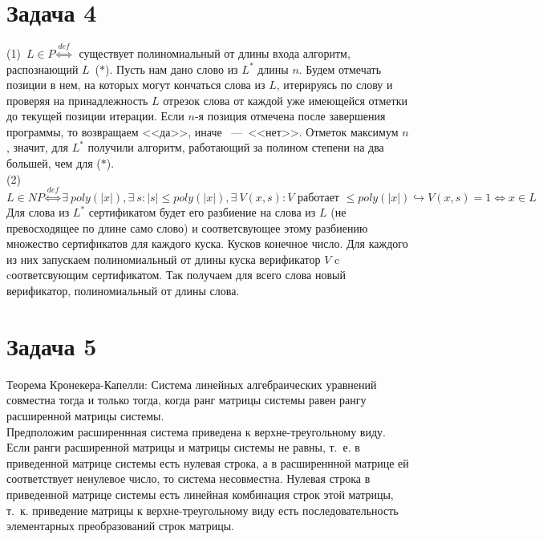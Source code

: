 \documentclass[a4paper,12pt]{article} %
\begin{document}
\section*{Задача 4}
(1)~$L \in P \overset{def}\Leftrightarrow ~$ существует полиномиальный от длины входа алгоритм, распознающий $L$~($*$). Пусть нам дано слово из $L^*$ длины $n$. Будем отмечать позиции в нем, на которых могут кончаться слова из $L$, итерируясь по слову и проверяя на принадлежность $L$ отрезок слова от каждой уже имеющейся отметки до текущей позиции итерации. Если $n$-я позиция отмечена после завершения программы, то возвращаем <<да>>, иначе ~---~<<нет>>. Отметок максимум $n$, значит, для $L^*$ получили алгоритм, работающий за полином степени на два большей, чем для ($*$).\\

\noindent (2)~$L \in NP \overset{def}\Leftrightarrow \exists~ poly(|x|), \exists~ s : |s| 
\leq poly(|x|), \exists~ V(x,s):V \text{~работает~} 
\leq poly(|x|) \hookrightarrow V(x,s) = 1 
\Leftrightarrow x \in L $\\
Для слова из $L^*$ сертификатом будет его разбиение на слова из $L$ (не превосходящее по длине само слово) и соответсвующее этому разбиению множество сертификатов для каждого куска. Кусков конечное число. Для каждого из них запускаем полиномиальный от длины куска верификатор $V$ c cоответсвующим сертификатом. Так получаем для всего слова новый верификатор, полиномиальный от длины слова. \\

\section*{Задача 5}
Теорема Кронекера-Капелли:
Система линейных алгебраических уравнений совместна тогда и только тогда, когда ранг матрицы системы равен рангу расширенной матрицы системы. \\
Предположим расширеннная система приведена к верхне-треугольному виду. Если ранги расширенной  матрицы и матрицы системы не равны, т.~е. в приведенной матрице системы есть нулевая строка, а в расширеннной матрице ей соответствует ненулевое число, то система несовместна. Нулевая строка в приведенной матрице системы есть линейная комбинация строк этой матрицы, т.~к. приведение матрицы к верхне-треугольному виду есть последовательность элементарных преобразований строк матрицы.\\
\end{document}
